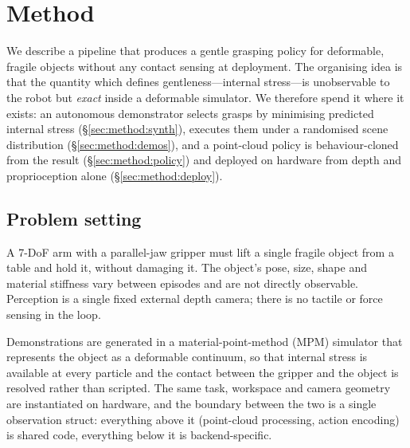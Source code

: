 \section{Method}
\label{sec:method}

We describe a pipeline that produces a gentle grasping policy for deformable, fragile
objects without any contact sensing at deployment. The organising idea is that the
quantity which defines gentleness---internal stress---is unobservable to the robot but
\emph{exact} inside a deformable simulator. We therefore spend it where it exists: an
autonomous demonstrator selects grasps by minimising predicted internal stress
(\S\ref{sec:method:synth}), executes them under a randomised scene distribution
(\S\ref{sec:method:demos}), and a point-cloud policy is behaviour-cloned from the result
(\S\ref{sec:method:policy}) and deployed on hardware from depth and proprioception alone
(\S\ref{sec:method:deploy}).

\subsection{Problem setting}
\label{sec:method:problem}

A 7-DoF arm with a parallel-jaw gripper must lift a single fragile object from a table and
hold it, without damaging it. The object's pose, size, shape and material stiffness vary
between episodes and are not directly observable. Perception is a single fixed external
depth camera; there is no tactile or force sensing in the loop.

Demonstrations are generated in a material-point-method (MPM) simulator that represents the
object as a deformable continuum, so that internal stress is available at every particle and
the contact between the gripper and the object is resolved rather than scripted. The same
task, workspace and camera geometry are instantiated on hardware, and the boundary between
the two is a single observation struct: everything above it (point-cloud processing, action
encoding) is shared code, everything below it is backend-specific.

